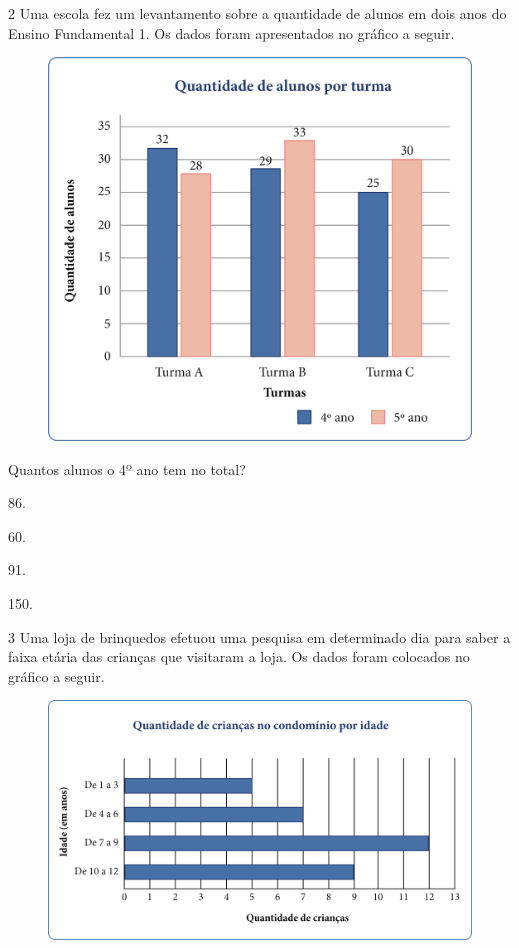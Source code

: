 \num{2} Uma escola fez um levantamento sobre a quantidade de alunos em dois anos
do Ensino Fundamental 1. Os dados foram apresentados no gráfico a seguir.

\begin{figure}[htpb!]
\centering
\includegraphics[width=.6\textwidth]{media/image50.png}
\end{figure}

Quantos alunos o 4º ano tem no total?

\begin{multicols}{2}
\begin{escolha}
\item
  86.
\item
  60.
\item
  91.
\item
  150.
\end{escolha}
\end{multicols}

\num{3} Uma loja de brinquedos efetuou uma pesquisa em determinado dia para
saber a faixa etária das crianças que visitaram a loja. Os dados foram
colocados no gráfico a seguir.

\begin{figure}[htpb!]
\centering
\includegraphics[width=\textwidth]{media/image51.png}
\end{figure}

